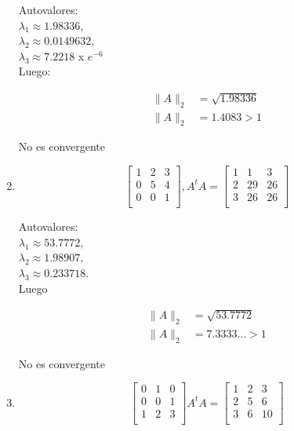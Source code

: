 \documentclass[12pt]{article}
\begin{document}
\begin{enumerate}
Autovalores: \\
$\lambda_1 \approx 1.98336 $,\\
$\lambda_2 \approx 0.0149632 $,\\
$\lambda_3 \approx 7.2218$ x $e^{-6} $\\

Luego:

\begin{align*}
    \parallel A \parallel_2 &= \sqrt{1.98336}\\
    \parallel A \parallel_2 &= 1.4083 > 1
\end{align*}

No es convergente

\item

\[
\begin{bmatrix}
    1 & 2 & 3 \\
    0 & 5 & 4 \\
    0 & 0 & 1 \\
\end{bmatrix},
A^tA = \begin{bmatrix}
    1 & 1 & 3 \\
    2 & 29 & 26 \\
    3 & 26 & 26 \\
\end{bmatrix}
\]

Autovalores: \\
$\lambda_1 \approx 53.7772,$ \\
$\lambda_2 \approx 1.98907, $\\
$\lambda_3 \approx 0.233718. $\\

Luego 

\begin{align*}
    \parallel A \parallel_2 &= \sqrt{53.7772}\\
    \parallel A \parallel_2 &= 7.3333\ldots > 1
\end{align*}

No es convergente

\item 

\[
\begin{bmatrix}
    0 & 1 & 0 \\
    0 & 0 & 1 \\
    1 & 2 & 3 \\
\end{bmatrix}
A^tA = \begin{bmatrix}
    1 & 2 & 3 \\
    2 & 5 & 6 \\
    3 & 6 & 10 \\
\end{bmatrix}
\]


\end{enumerate}
\end{document}
